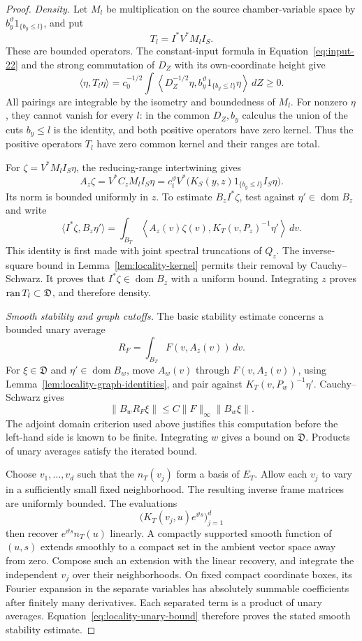 \begin{proof}
\emph{Density.}
Let $M_l$ be multiplication on the source chamber-variable space by
$b_y^\vartheta1_{\{b_y\le l\}}$, and put
\[
 T_l=I^*V^*M_lI_S.
\]
These are bounded operators.  The constant-input formula in
Equation~\eqref{eq:input-22} and the strong commutation of
$D_Z$ with its own-coordinate height give
\[
 \langle\eta,T_l\eta\rangle
 =c_0^{-1/2}\int
 \left\langle D_Z^{-1/2}\eta,
 b_y^\vartheta1_{\{b_y\le l\}}\eta\right\rangle\,dZ\ge0.
\]
All pairings are integrable by the isometry and boundedness of $M_l$.
For nonzero $\eta$, they cannot vanish for every $l$: in the common
$D_Z,b_y$ calculus the union of the cuts $b_y\le l$ is the identity,
and both positive operators have zero kernel.  Thus the positive
operators $T_l$ have zero common kernel and their ranges are total.

For $\zeta=V^*M_lI_S\eta$, the reducing-range intertwining gives
\[
 A_z\zeta
 =V^*C_z M_lI_S\eta
 =c_i^\vartheta V^*
   \big(K_S(y,z)1_{\{b_y\le l\}}I_S\eta\big).
\]
Its norm is bounded uniformly in $z$.  To estimate $B_zI^*\zeta$,
test against $\eta'\in\operatorname{dom} B_z$ and write
\[
 \langle I^*\zeta,B_z\eta'\rangle
 =\int_{B_T}
 \left\langle A_z(v)\zeta(v),
 K_T(v,P_z)^{-1}\eta'\right\rangle\,dv.
\]
This identity is first made with joint spectral truncations of $Q_z$.
The inverse-square bound in Lemma~\ref{lem:locality-kernel} permits
their removal by Cauchy--Schwarz.  It proves that $I^*\zeta\in\operatorname{dom} B_z$
with a uniform bound.  Integrating $z$ proves $\operatorname{ran} T_l\subset\mathfrak D$,
and therefore density.

\emph{Smooth stability and graph cutoffs.}
The basic stability estimate concerns a bounded unary average
\[
 R_F=\int_{B_T}F(v,A_z(v))\,dv.
\]
For $\xi\in\mathfrak D$ and $\eta'\in\operatorname{dom} B_w$, move $A_w(v)$
through $F(v,A_z(v))$, using
Lemma~\ref{lem:locality-graph-identities}, and pair against
$K_T(v,P_w)^{-1}\eta'$.  Cauchy--Schwarz gives
\begin{equation}
 \|B_w R_F\xi\|
 \le C\|F\|_\infty\|B_w\xi\|.
 \label{eq:locality-unary-bound}
\end{equation}
The adjoint domain criterion used above justifies this computation
before the left-hand side is known to be finite.  Integrating $w$
gives a bound on $\mathfrak D$.  Products of unary averages satisfy
the iterated bound.

Choose $v_1,\ldots,v_d$ such that the $n_T(v_j)$ form a basis of
$E_T$.  Allow each $v_j$ to vary in a sufficiently small fixed
neighborhood.  The resulting inverse frame matrices are uniformly
bounded.  The evaluations
\[
 \big(K_T(v_j,u)e^{\vartheta s}\big)_{j=1}^d
\]
then recover $e^{\vartheta s}n_T(u)$ linearly.  A compactly supported
smooth function of $(u,s)$ extends smoothly to a compact set in the
ambient vector space away from zero.  Compose such an extension with
the linear recovery, and integrate the independent $v_j$ over their
neighborhoods.  On fixed compact coordinate boxes, its Fourier
expansion in the separate variables has absolutely summable
coefficients after finitely many derivatives.  Each separated term
is a product of unary averages.  Equation~\eqref{eq:locality-unary-bound}
therefore proves the stated smooth stability estimate.


\end{proof}
